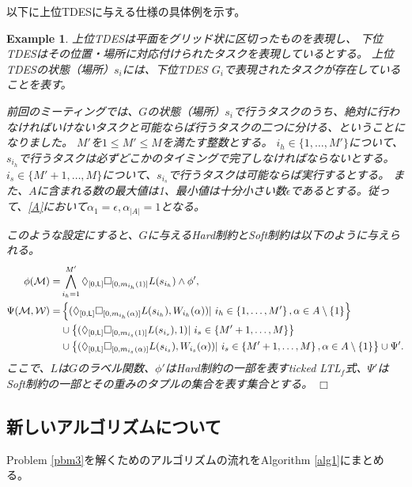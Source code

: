 \documentclass[ 10pt]{jsarticle}
\newcommand{\qedwhite}{\hfill \ensuremath{\Box}}
\newtheorem{exa}{Example}
\newcommand{\req}[1]{\eqref{#1}}
\newcommand{\Len}{{\sf L}}
\begin{document}
以下に上位TDESに与える仕様の具体例を示す。
\begin{exa}
上位TDESは平面をグリッド状に区切ったものを表現し、
下位TDESはその位置・場所に対応付けられたタスクを表現しているとする。
上位TDESの状態（場所）$s_i$には、下位TDES $G_i$で表現されたタスクが存在していることを表す。

前回のミーティングでは、$G$の状態（場所）$s_i$で行うタスクのうち、絶対に行わなければいけないタスクと可能ならば行うタスクの二つに分ける、ということになりました。
$M'$を$1\leq M'\leq M$を満たす整数とする。
$i_h\in\{1,\ldots, M'\}$について、$s_{i_h}$で行うタスクは必ずどこかのタイミングで完了しなければならないとする。
$i_s\in\{M'+1,\ldots, M\}$について、$s_{i_s}$で行うタスクは可能ならば実行するとする。
また、$A$に含まれる数の最大値は1、最小値は十分小さい数$\epsilon$であるとする。従って、\req{A}において$\alpha_1=\epsilon,\alpha_{|A|}=1$となる。

このような設定にすると、$G$に与えるHard制約とSoft制約は以下のように与えられる。
\begin{align}
\phi(\mathcal{M})=&\bigwedge_{i_h=1}^{M'}\Diamond_{[0,\Len]}\Box_{[0,m_{i_h}(1)]}L(s_{i_h}) \land \phi',\\
\Psi(\mathcal{M},\mathcal{W})
=&\left\{
(\Diamond_{[0,\Len]}\Box_{[0,m_{i_h}(\alpha)]}L(s_{i_h}),W_{i_h}(\alpha))|\ i_h\in\left\{1,\ldots, M'\right\}, \alpha\in A\setminus\{1\}
\right\}
\notag\\
&\cup
\left\{
(\Diamond_{[0,\Len]}\Box_{[0,m_{i_s}(1)]}L(s_{i_s}),1)|\ i_s\in\left\{M'+1,\ldots, M\right\}
\right\}
\notag\\
&\cup
\left\{
(\Diamond_{[0,\Len]}\Box_{[0,m_{i_s}(\alpha)]}L(s_{i_s}),W_{i_s}(\alpha))|\ i_s\in\left\{M'+1,\ldots, M\right\}, \alpha\in A\setminus\{1\}
\right\}
\cup \Psi'.
\end{align}
ここで、$L$は$G$のラベル関数、$\phi'$はHard制約の一部を表すticked LTL${}_f$式、$\Psi'$はSoft制約の一部とその重みのタプルの集合を表す集合とする。
\qedwhite
\end{exa}
%
\subsection{新しいアルゴリズムについて}\label{app}
%

Problem \ref{pbm3}を解くためのアルゴリズムの流れをAlgorithm \ref{alg1}にまとめる。
\end{document}
